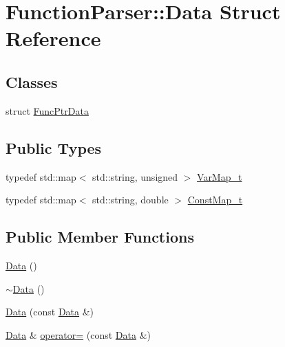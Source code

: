 \hypertarget{struct_function_parser_1_1_data}{}\section{Function\+Parser\+:\+:Data Struct Reference}
\label{struct_function_parser_1_1_data}
\subsection*{Classes}
\begin{DoxyCompactItemize}
\item 
struct \hyperlink{struct_function_parser_1_1_data_1_1_func_ptr_data}{Func\+Ptr\+Data}
\end{DoxyCompactItemize}
\subsection*{Public Types}
\begin{DoxyCompactItemize}
\item 
typedef std\+::map$<$ std\+::string, unsigned $>$ \hyperlink{struct_function_parser_1_1_data_a02f3fbca3164d0e498312b418258ea84}{Var\+Map\+\_\+t}
\item 
typedef std\+::map$<$ std\+::string, double $>$ \hyperlink{struct_function_parser_1_1_data_a74ff90f5d1687b68363d1602ef0ccece}{Const\+Map\+\_\+t}
\end{DoxyCompactItemize}
\subsection*{Public Member Functions}
\begin{DoxyCompactItemize}
\item 
\hyperlink{struct_function_parser_1_1_data_a2f7002e4cc588de6091472be924689b0}{Data} ()
\item 
\hyperlink{struct_function_parser_1_1_data_a1091c2cf47cbd047273335f913bb2f82}{$\sim$\+Data} ()
\item 
\hyperlink{struct_function_parser_1_1_data_a680226a014211a42b2186a3dc0da0292}{Data} (const \hyperlink{struct_function_parser_1_1_data}{Data} \&)
\item 
\hyperlink{struct_function_parser_1_1_data}{Data} \& \hyperlink{struct_function_parser_1_1_data_a5de0c72e14a8dc7fd8d708dfbb013a45}{operator=} (const \hyperlink{struct_function_parser_1_1_data}{Data} \&)
\end{DoxyCompactItemize}
